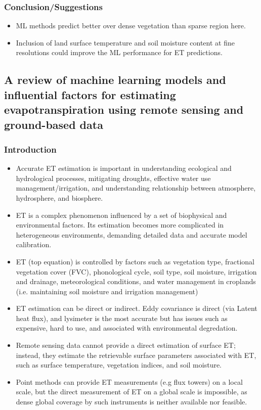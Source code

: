 \documentclass[paper=a4, fontsize=12pt]{scrartcl}
\begin{document}
	
	\subsubsection*{Conclusion/Suggestions}
	\begin{itemize}
		\item ML methods predict better over dense vegetation than sparse region here.
		\item Inclusion of land surface temperature and soil moisture content at fine resolutions could improve the ML performance for ET predictions.  
	\end{itemize}
	
	\subsection{A review of machine learning models and influential factors for estimating evapotranspiration using remote sensing and ground-based data \citep{amani2023review}}
	
	\subsubsection{Introduction}
	\begin{itemize}
		\item Accurate ET estimation is important in understanding ecological and hydrological processes, mitigating droughts, effective water use management/irrigation, and understanding relationship between atmosphere, hydrosphere, and biosphere.
		\item ET is a complex phenomenon influenced by a set of biophysical and environmental factors. Its estimation becomes more complicated in heterogeneous environments, demanding detailed data and accurate model calibration.
		\item ET (top equation) is controlled by factors such as vegetation type, fractional vegetation cover (FVC), phonological cycle, soil type, soil moisture, irrigation and drainage, meteorological conditions, and water management in croplands (i.e. maintaining soil moisture and irrigation management)
		\item ET estimation can be direct or indirect. Eddy covariance is direct (via Latent heat flux), and lysimeter is the most accurate but has issues such as expensive, hard to use, and associated with environmental degredation.
		\item Remote sensing data cannot provide a direct estimation of surface ET; instead, they estimate the retrievable surface parameters associated with ET, such as surface temperature, vegetation indices, and soil moisture.
		\item Point methods can provide ET measurements (e.g flux towers) on a local scale, but the direct measurement of ET on a global scale is impossible, as dense global coverage by such instruments is neither available nor feasible.
	\end{itemize}
	
\end{document}
